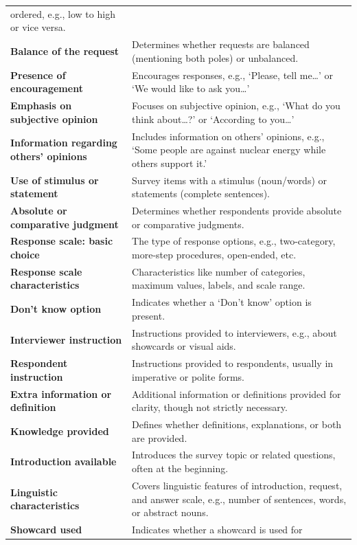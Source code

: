 \documentclass[
  letterpaper,
  DIV=11,
  numbers=noendperiod]{scrartcl}
\begin{document}
\begin{tcolorbox}
\begin{longtable}[]{@{}
  >{\raggedright\arraybackslash}p{}
  >{\raggedright\arraybackslash}p{}@{}}
ordered, e.g., low to high or vice versa. \\
\textbf{Balance of the request} & Determines whether requests are
balanced (mentioning both poles) or unbalanced. \\
\textbf{Presence of encouragement} & Encourages responses, e.g.,
`Please, tell me\ldots{}' or `We would like to ask you\ldots{}' \\
\textbf{Emphasis on subjective opinion} & Focuses on subjective opinion,
e.g., `What do you think about\ldots?' or `According to you\ldots{}' \\
\textbf{Information regarding others' opinions} & Includes information
on others' opinions, e.g., `Some people are against nuclear energy while
others support it.' \\
\textbf{Use of stimulus or statement} & Survey items with a stimulus
(noun/words) or statements (complete sentences). \\
\textbf{Absolute or comparative judgment} & Determines whether
respondents provide absolute or comparative judgments. \\
\textbf{Response scale: basic choice} & The type of response options,
e.g., two-category, more-step procedures, open-ended, etc. \\
\textbf{Response scale characteristics} & Characteristics like number of
categories, maximum values, labels, and scale range. \\
\textbf{Don't know option} & Indicates whether a `Don't know' option is
present. \\
\textbf{Interviewer instruction} & Instructions provided to
interviewers, e.g., about showcards or visual aids. \\
\textbf{Respondent instruction} & Instructions provided to respondents,
usually in imperative or polite forms. \\
\textbf{Extra information or definition} & Additional information or
definitions provided for clarity, though not strictly necessary. \\
\textbf{Knowledge provided} & Defines whether definitions, explanations,
or both are provided. \\
\textbf{Introduction available} & Introduces the survey topic or related
questions, often at the beginning. \\
\textbf{Linguistic characteristics} & Covers linguistic features of
introduction, request, and answer scale, e.g., number of sentences,
words, or abstract nouns. \\
\textbf{Showcard used} & Indicates whether a showcard is used for

\end{longtable}
\end{tcolorbox}
\end{document}
